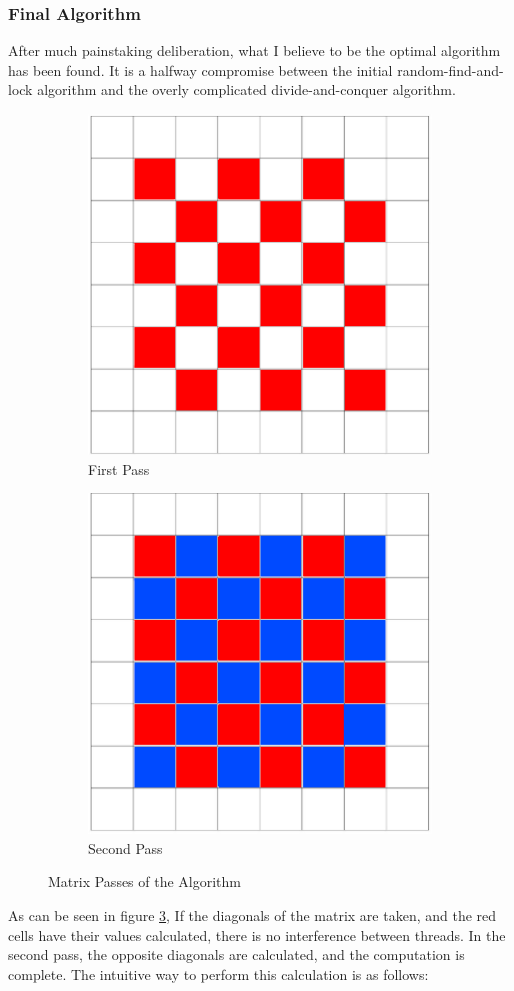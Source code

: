 \documentclass{article}
\begin{document}
\subsubsection{Final Algorithm}
After much painstaking deliberation, what I believe to be the optimal algorithm has been found. It is a halfway compromise between the initial random-find-and-lock algorithm and the overly complicated divide-and-conquer algorithm.\\
\begin{figure}
    \centering
    \begin{subfigure}{.5\textwidth}
      \centering
      \includegraphics[width=.4\linewidth]{4.png}
      \caption{First Pass}
      \label{fig:sub1}
    \end{subfigure}%
    \begin{subfigure}{.5\textwidth}
      \centering
      \includegraphics[width=.4\linewidth]{5.png}
      \caption{Second Pass}
      \label{fig:sub2}
    \end{subfigure}
    \caption{Matrix Passes of the Algorithm}
    \label{fig4}
    \end{figure}
As can be seen in figure \ref{fig4}, If the diagonals of the matrix are taken, and the red cells have their values calculated, there is no interference between threads. In the second pass, the opposite diagonals are calculated, and the computation is complete. The intuitive way to perform this calculation is as follows:
\end{document}
